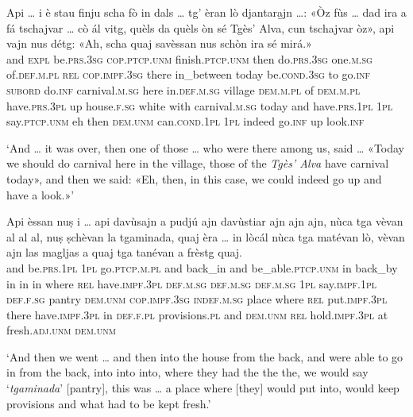 \begin{linenumbers}
	\gll    Api … i è stau finju scha fò in dals … tg’ èran lò djantara̱jn …: «Òz fùs … dad ira a fá tschajvar … cò ál vitg, quèls da quèls òn sé Tgès’ Alva, cun tschajvar òz», api vajn nus détg: «Ah, scha quaj savèssan nus schòn ira sé mirá.»\\
	and {} \textsc{expl} be.\textsc{prs.3sg} \textsc{cop.ptcp.unm} finish.\textsc{ptcp.unm} then do.\textsc{prs.3sg} one.\textsc{m.sg} of.\textsc{def.m.pl} {} \textsc{rel} \textsc{cop.impf.3sg} there in\_between {} today be.\textsc{cond.3sg} {} to go.\textsc{inf} \textsc{subord} do.\textsc{inf} carnival.\textsc{m.sg} {} here in.\textsc{def.m.sg} village \textsc{dem.m.pl}  of \textsc{dem.m.pl} have.\textsc{prs.3pl} up house.\textsc{f.sg} white with carnival.\textsc{m.sg} today and have.\textsc{prs.1pl} \textsc{1pl} say.\textsc{ptcp.unm} eh then \textsc{dem.unm}  can.\textsc{cond.1pl} \textsc{1pl} indeed go.\textsc{inf} up look.\textsc{inf} \\
\end{linenumbers}
\medskip
\glt `And … it was over, then one of those … who were there among us, said … «Today we should do carnival here in the village, those of the \textit{Tgès' Alva} have carnival today», and then we said: «Eh, then, in this case, we could indeed go up and have a look.»'
\medskip

\begin{linenumbers}
	\gll    Api èssan nuṣ i … api davùsajn a pudjú ajn davùstiar ajn ajn ajn, nùca tga vèvan al al al, nuṣ ṣchèvan la tgaminada, quaj èra … in lòcál nùca tga matévan lò, vèvan ajn las magljas a quaj tga tanévan a frèstg quaj.\\
	and be.\textsc{prs.1pl} \textsc{1pl} go.\textsc{ptcp.m.pl} {} and back\_in and be\_able.\textsc{ptcp.unm} in back\_by in in in where \textsc{rel} have.\textsc{impf.3pl} \textsc{def.m.sg} \textsc{def.m.sg} \textsc{def.m.sg} \textsc{1pl}  say.\textsc{impf.1pl} \textsc{def.f.sg} pantry \textsc{dem.unm} \textsc{cop.impf.3sg} {} \textsc{indef.m.sg} place where \textsc{rel} put.\textsc{impf.3pl} there have.\textsc{impf.3pl} in  \textsc{def.f.pl} provisions.\textsc{pl} and \textsc{dem.unm} \textsc{rel}  hold.\textsc{impf.3pl} at fresh.\textsc{adj.unm} \textsc{dem.unm}\\
\end{linenumbers}
\medskip
\glt `And then we went … and then into the house from the back, and were able to go in from the back, into into into, where they had the the the, we would say ‘\textit{tgaminada}’ [pantry], this was … a place where [they] would put into, would keep provisions and what had to be kept fresh.'
\medskip

